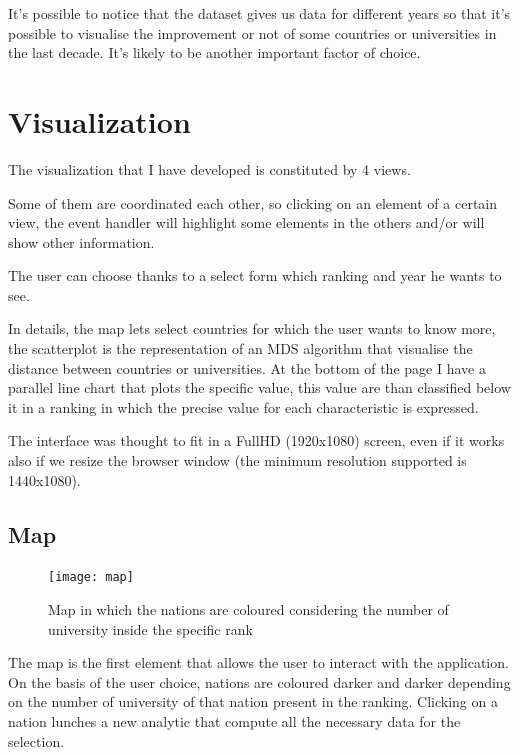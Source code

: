\documentclass[journal]{vgtc}                %
\begin{document}
It's possible to notice that the dataset gives us data for different years
so that it's possible to visualise the improvement or not of some countries or universities in the last decade.
It's likely to be another important factor of choice.


\section{Visualization}
The visualization that I have developed is constituted by 4 views.

Some of them are coordinated each other, so clicking on an element of a
certain view, the event handler will highlight some elements in the
others and/or will show other information. 

The user can choose thanks to a select form which ranking and year he wants to see.

In details, the map lets select countries for which the user wants to know more,
the scatterplot is the representation of an MDS algorithm that visualise the 
distance between countries or universities.
At the bottom of the page I have a parallel line chart that plots the specific value,
this value are than classified below it in a ranking in which the precise value for each 
characteristic is expressed.

The interface was thought to fit in a FullHD (1920x1080) screen,
even if it works also if we resize the browser window (the minimum
resolution supported is 1440x1080).


\subsection{Map}


\begin{figure}[h]
  \centering
  \texttt{[image: map]}
  \caption{Map in which the nations are coloured considering the number of university inside the specific rank}
  \label{map}
\end{figure}


The map is the first element that allows the user to interact with the application.
On the basis of the user choice, nations are coloured darker and darker depending on 
the number of university of that nation present in the ranking.
Clicking on a nation lunches a new analytic that compute all the necessary data for the
selection.
\end{document}
